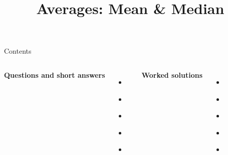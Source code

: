 \documentclass{beamer}
\title{Averages: Mean \& Median}
\author{}
\date{}
\begin{document}
\frame{\titlepage}

\begin{frame}{Contents}
\small
\begin{columns}[T]
\textbf{Questions and short answers}
\begin{itemize}
  \item \hyperlink{q-st1}{}
  \item \hyperlink{q-st2}{}
  \item \hyperlink{q-st3}{}
  \item \hyperlink{q-st4}{}
  \item \hyperlink{q-st5}{}
\end{itemize}

\textbf{Worked solutions}
\begin{itemize}
  \item \hyperlink{work-st1}{}
  \item \hyperlink{work-st2}{}
  \item \hyperlink{work-st3}{}
  \item \hyperlink{work-st4}{}
  \item \hyperlink{work-st5}{}
\end{itemize}
\end{columns}
\end{frame}
\end{document}
